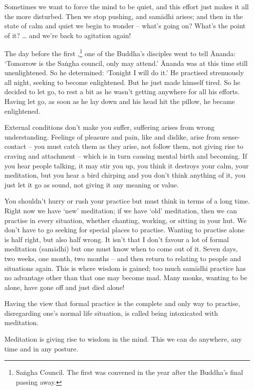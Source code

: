 Sometimes we want to force the mind to be quiet, and this effort just makes it all the more disturbed. Then we stop pushing, and sam\=adhi arises; and then in the state of calm and quiet we begin to wonder -- what's going on? What's the point of it? \ldots{} and we're back to agitation again!

The day before the first ,\footnote{Sa\.ngha Council. The first was convened in the year after the Buddha's final passing away.} one of the Buddha's disciples went to tell \=Ananda: `Tomorrow is the Sa\.ngha council, only  may attend.' \=Ananda was at this time still unenlightened. So he determined: `Tonight I will do it.' He practised strenuously all night, seeking to become enlightened. But he just made himself tired. So he decided to let go, to rest a bit as he wasn't getting anywhere for all his efforts. Having let go, as soon as he lay down and his head hit the pillow, he became enlightened.

External conditions don't make you suffer, suffering arises from wrong understanding. Feelings of pleasure and pain, like and dislike, arise from sense-contact -- you must catch them as they arise, not follow them, not giving rise to craving and attachment -- which is in turn causing mental birth and becoming. If you hear people talking, it may stir you up, you think it destroys your calm, your meditation, but you hear a bird chirping and you don't think anything of it, you just let it go as sound, not giving it any meaning or value.

You shouldn't hurry or rush your practice but must think in terms of a long time. Right now we have `new' meditation; if we have `old' meditation, then we can practise in every situation, whether chanting, working, or sitting in your hut. We don't have to go seeking for special places to practise. Wanting to practise alone is half right, but also half wrong. It isn't that I don't favour a lot of formal meditation (sam\=adhi) but one must know when to come out of it. Seven days, two weeks, one month, two months -- and then return to relating to people and situations again. This is where wisdom is gained; too much sam\=adhi practice has no advantage other than that one may become mad. Many monks, wanting to be alone, have gone off and just died alone!

Having the view that formal practice is the complete and only way to practise, disregarding one's normal life situation, is called being intoxicated with meditation.

Meditation is giving rise to wisdom in the mind. This we can do anywhere, any time and in any posture.
